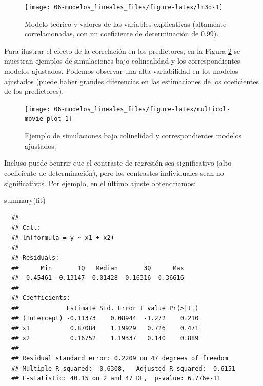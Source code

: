 \documentclass[
]{book}
\newenvironment{Shaded}{\begin{snugshade}}{\end{snugshade}}
\newcommand{\FunctionTok}[1]{\textcolor[rgb]{0.00,0.00,0.00}{#1}}
\newcommand{\NormalTok}[1]{#1}
\theoremstyle{break}
\theoremstyle{nonumberplain}
\begin{document}
\begin{figure}[!htb]

{\centering \texttt{[image: 06-modelos\_lineales\_files/figure-latex/lm3d-1]} 

}

\caption{Modelo teórico y valores de las variables explicativas (altamente correlacionadas, con un coeficiente de determinación de 0.99).}\label{fig:lm3d}
\end{figure}

Para ilustrar el efecto de la correlación en los predictores, en la Figura \ref{fig:multicol-movie-plot} se muestran ejemplos de simulaciones bajo colinealidad y los correspondientes modelos ajustados.
Podemos observar una alta variabilidad en los modelos ajustados (puede haber grandes diferencias en las estimaciones de los coeficientes de los predictores).

\begin{figure}[!htb]

{\centering \texttt{[image: 06-modelos\_lineales\_files/figure-latex/multicol-movie-plot-1]} 

}

\caption{Ejemplo de simulaciones bajo colinelidad y correspondientes modelos ajustados.}\label{fig:multicol-movie-plot}
\end{figure}

Incluso puede ocurrir que el contraste de regresión sea significativo (alto coeficiente de determinación), pero los contrastes individuales sean no significativos.
Por ejemplo, en el último ajuste obtendríamos:

\begin{Shaded}
\begin{Highlighting}[]
\FunctionTok{summary}\NormalTok{(fit)}
\end{Highlighting}
\end{Shaded}

\begin{verbatim}
  ## 
  ## Call:
  ## lm(formula = y ~ x1 + x2)
  ## 
  ## Residuals:
  ##      Min       1Q   Median       3Q      Max 
  ## -0.45461 -0.13147  0.01428  0.16316  0.36616 
  ## 
  ## Coefficients:
  ##             Estimate Std. Error t value Pr(>|t|)
  ## (Intercept) -0.11373    0.08944  -1.272    0.210
  ## x1           0.87084    1.19929   0.726    0.471
  ## x2           0.16752    1.19337   0.140    0.889
  ## 
  ## Residual standard error: 0.2209 on 47 degrees of freedom
  ## Multiple R-squared:  0.6308,   Adjusted R-squared:  0.6151 
  ## F-statistic: 40.15 on 2 and 47 DF,  p-value: 6.776e-11
\end{verbatim}
\end{document}
